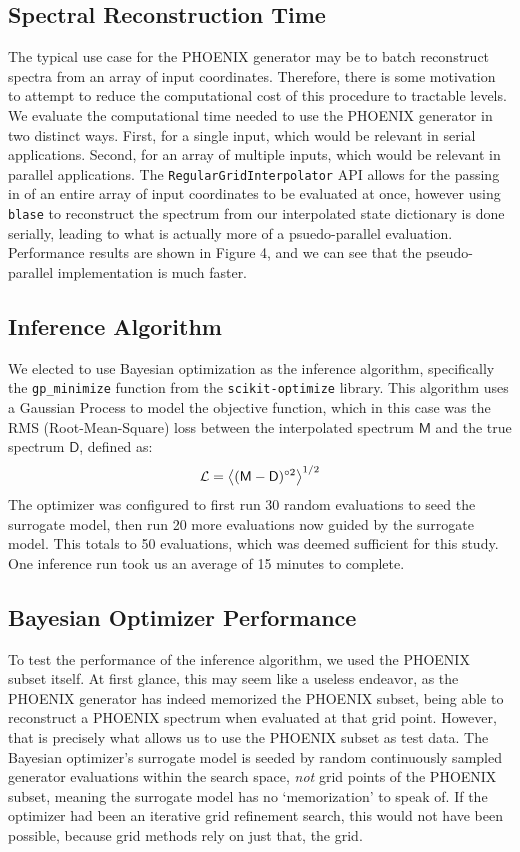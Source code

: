\documentclass[twocolumn]{aastex631}
\begin{document}
\subsection{Spectral Reconstruction Time}
The typical use case for the PHOENIX generator may be to batch 
reconstruct spectra from an array of input coordinates. Therefore, there
is some motivation to attempt to reduce the computational cost of this
procedure to tractable levels. We evaluate the computational time needed
to use the PHOENIX generator in two distinct ways. First, for a single
input, which would be relevant in serial applications. Second, for an array
of multiple inputs, which would be relevant in parallel applications.
The \texttt{RegularGridInterpolator} API allows for the passing in of 
an entire array of input coordinates to be evaluated at once, however 
using \texttt{blase} to reconstruct the spectrum from our interpolated
state dictionary is done serially, leading to what is actually more of 
a psuedo-parallel evaluation. Performance results are shown in Figure 4,
and we can see that the pseudo-parallel implementation is much faster.

\subsection{Inference Algorithm}
We elected to use Bayesian optimization as the inference algorithm, specifically 
the \texttt{gp\_minimize} function from the \texttt{scikit-optimize} library. 
This algorithm uses a Gaussian Process to model the objective function, which in 
this case was the RMS (Root-Mean-Square) loss between the interpolated spectrum 
$\mathsf{M}$ and the true spectrum $\mathsf{D}$, defined as:
\begin{gather}
    \mathcal{L} = \ev{(\mathsf{M} - \mathsf{D})^{\circ 2}}^{1/2}
\end{gather}
The optimizer was configured to first run 30 random 
evaluations to seed the surrogate model, then run 20 more evaluations now guided 
by the surrogate model. This totals to 50 evaluations, which was deemed 
sufficient for this study. One inference run took us an average of 15 minutes to 
complete.

\subsection{Bayesian Optimizer Performance}
To test the performance of the inference algorithm, we used the PHOENIX subset
itself. At first glance, this may seem like a useless endeavor, as the 
PHOENIX generator has indeed memorized the PHOENIX subset, being able to
reconstruct a PHOENIX spectrum when evaluated at that grid point. However,
that is precisely what allows us to use the PHOENIX subset as test data.
The Bayesian optimizer's surrogate model is seeded by random continuously 
sampled generator evaluations within the search space, \textit{not} grid 
points of the PHOENIX subset, meaning the surrogate model has no `memorization' 
to speak of. If the optimizer had been an iterative grid refinement search, 
this would not have been possible, because grid methods rely on just that, 
the grid.
\end{document}
